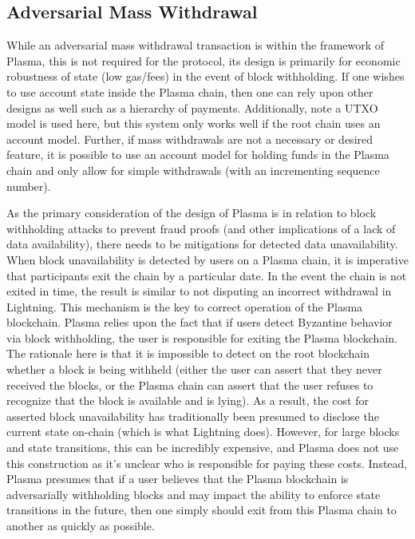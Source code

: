 \documentclass[letterpaper, 11pt]{article}
\begin{document}
\subsection{Adversarial Mass Withdrawal}

While an adversarial mass withdrawal transaction is within the framework of
Plasma, this is not required for the protocol, its design is primarily for
economic robustness of state (low gas/fees) in the event of block withholding.
If one wishes to use account state inside the Plasma chain, then one can rely
upon other designs as well such as a hierarchy of payments. Additionally, note a
UTXO model is used here, but this system only works well if the root chain uses
an account model. Further, if mass withdrawals are not a necessary or desired
feature, it is possible to use an account model for holding funds in the Plasma
chain and only allow for simple withdrawals (with an incrementing sequence
number).

As the primary consideration of the design of Plasma is in relation to block
withholding attacks to prevent fraud proofs (and other implications of a lack of
data availability), there needs to be mitigations for detected data
unavailability. When block unavailability is detected by users on a Plasma
chain, it is imperative that participants exit the chain by a particular date.
In the event the chain is not exited in time, the result is similar to not
disputing an incorrect withdrawal in Lightning. This mechanism is the key to
correct operation of the Plasma blockchain. Plasma relies upon the fact that if
users detect Byzantine behavior via block withholding, the user is responsible
for exiting the Plasma blockchain. The rationale here is that it is impossible
to detect on the root blockchain whether a block is being withheld (either the
user can assert that they never received the blocks, or the Plasma chain can
assert that the user refuses to recognize that the block is available and is
lying). As a result, the cost for asserted block unavailability has
traditionally been presumed to disclose the current state on-chain (which is
what Lightning does). However, for large blocks and state transitions, this can
be incredibly expensive, and Plasma does not use this construction as it's
unclear who is responsible for paying these costs. Instead, Plasma presumes that
if a user believes that the Plasma blockchain is adversarially withholding
blocks and may impact the ability to enforce state transitions in the future,
then one simply should exit from this Plasma chain to another as quickly as
possible.
\end{document}
